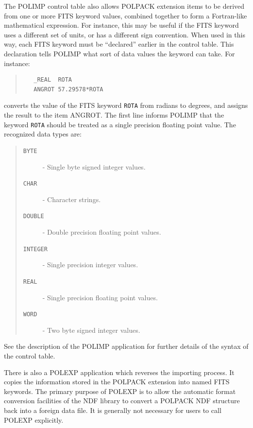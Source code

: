 \documentclass[twoside,11pt]{article}
\newcommand{\htmlref}[2]{#1}
\renewcommand{\_}{\texttt{\symbol{95}}}
\newenvironment{myquote}{\begin{quote}\begin{small}}{\end{small}\end{quote}}
\begin{document}
The POLIMP control table also allows POLPACK extension items to be
derived from one or more FITS keyword values, combined together to form a
Fortran-like mathematical expression. For instance, this may be useful if
the FITS keyword uses a different set of units, or has a different sign
convention. When used in this way, each FITS keyword must be ``declared''
earlier in the control table. This declaration tells POLIMP what sort of
data values the keyword can take. For instance:

\begin{myquote}
\begin{verbatim}
   _REAL  ROTA
   ANGROT 57.29578*ROTA
\end{verbatim}
\end{myquote}

converts the value of the FITS keyword \verb+ROTA+ from radians to
degrees, and assigns the result to the item ANGROT.
The first line informs POLIMP that the keyword \verb+ROTA+ should be
treated as a single precision floating point value. The recognized data
types are:

\begin{quote}
\begin{description}
\item[\texttt{\_BYTE}]		- Single byte signed integer values.
\item[\texttt{\_CHAR}]		- Character strings.
\item[\texttt{\_DOUBLE}]       	- Double precision floating point values.
\item[\texttt{\_INTEGER}]	- Single precision integer values.
\item[\texttt{\_REAL}]		- Single precision floating point values.
\item[\texttt{\_WORD}]		- Two byte signed integer values.
\end{description}
\end{quote}

See the description of the \htmlref{POLIMP}{POLIMP} application for
further details of the syntax of the control table.

There is also a \htmlref{POLEXP}{POLEXP} application which reverses the 
importing process. It copies the information stored in the POLPACK
extension into named FITS keywords. The primary purpose of POLEXP is 
to allow the automatic format conversion facilities of the NDF library to
convert a POLPACK NDF structure back into a foreign data file.
It is generally not necessary for users to call POLEXP explicitly. 
\end{document}
